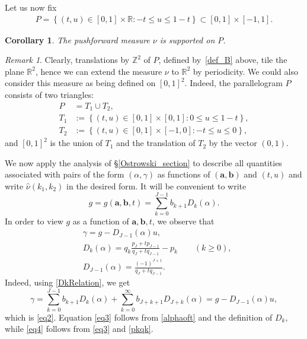 \documentclass[12pt, reqno]{amsart}
\newtheorem{cor}[thm]{Corollary}
\theoremstyle{definition}
\theoremstyle{remark}
\newtheorem{remark}[thm]{Remark}
\numberwithin{equation}{section}
\def\alp{{\alpha}} \def\bfalp{{\boldsymbol \alpha}}
\def\gam{{\gamma}} \def\Gam{{\Gamma}}
\def\leq{\leqslant}
\def \bR {\mathbb R}
\def \bZ {\mathbb Z}
\def \ba {\mathbf a}
\def \bb {\mathbf b}
\begin{document}
Let us now fix
\begin{equation} \label{def_B}
\begin{aligned}
P = \left\{(t,u)\in [0,1]\times\mathbb{R}: -t\leq u\leq 1-t \right\}\subset [0,1]\times[-1,1].
\end{aligned}
\end{equation}

\begin{cor} The pushforward measure $\nu$ is supported on $P$.
\end{cor} 

\begin{remark} \label{period_nu}
Clearly, translations by $\bZ^2$ of $P$, defined by~\eqref{def_B} above, tile the plane $\bR^2$, hence we can extend the measure $\nu$ to $\bR^2$ by periodicity. We could also consider this measure as being defined on $[0,1]^2$. Indeed, the parallelogram $P$ consists of two triangles:
\[
\begin{aligned}
P&=T_1\cup T_2,\\
T_1&:=\left\{(t,u)\in [0,1]\times [0,1] : 0 \leq u\leq 1-t \right\},\\
T_2&:=\left\{(t,u)\in [0,1]\times [-1,0] : -t \leq u\leq 0 \right\},
\end{aligned}
\]
and $[0,1]^2$ is the union of $T_1$ and the translation of $T_2$ by the vector $(0,1)$.
\end{remark}

We now apply the analysis of \S \ref{Ostrowski_section} to describe all quantities associated with pairs of the form $(\alp,\gam)$ as functions of  $(\ba,\bb)$ and $(t,u)$ and write $\widehat\nu(k_1,k_2)$ in the desired form. It will be convenient to write
\[
g = g(\ba,\bb,t)= \sum_{k=0}^{J-1} b_{k+1} D_k(\alp).
\]
In order to view $g$ as a function of $\ba,\bb,t$, we observe that
\begin{align}
&\gamma = g  - D_{J-1}(\alp) u, \label{eq2}\\
&D_k(\alp) = q_k \frac{p_J + tp_{J-1}}{q_J + tq_{J-1}} - p_k \qquad (k \ge 0), \label{eq3} \\
&D_{J-1}(\alp)  = \frac{(-1)^{J+1}}{q_J + tq_{J-1}}. \label{eq4}
\end{align}
Indeed, using \eqref{DkRelation}, we get 
\[
\gamma = \sum_{k=0}^{J-1}b_{k+1}D_{k}(\alp) + \sum_{k=0}^{\infty}b_{J+k+1}D_{J+k}(\alp) = g - D_{J-1}(\alp) u,
\] 
which is \eqref{eq2}. Equation \eqref{eq3} follows from \eqref{alphaoft} and the definition of $D_k$, while \eqref{eq4} follows from \eqref{eq3} and \eqref{pkqk}. 
\end{document}
